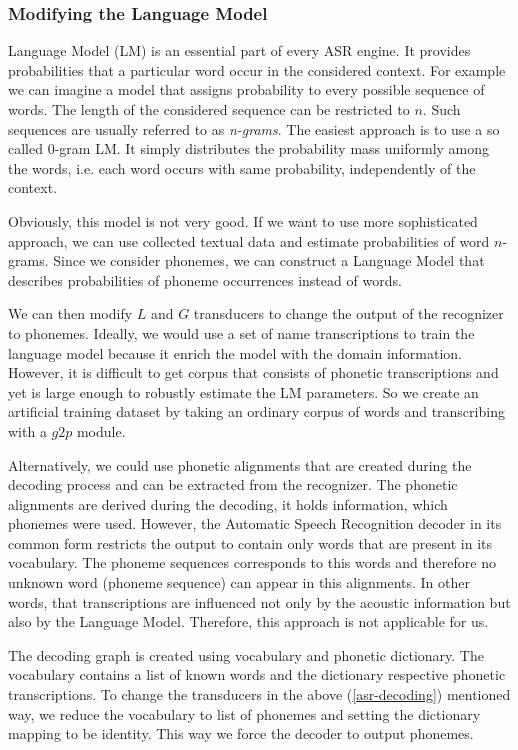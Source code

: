 \subsubsection{Modifying the Language Model}
Language Model (LM) is an essential part of every ASR engine.
It provides probabilities that a particular word occur in the considered context. 
For example we can imagine a model that assigns probability to every possible sequence of words.
The length of the considered sequence can be restricted to $n$.
Such sequences are usually referred to as \textit{n-grams}.
The easiest approach is to use a so called 0-gram LM.
It simply distributes the probability mass uniformly among the words, i.e. each word occurs with same probability, independently of the context.
\par
Obviously, this model is not very good.
If we want to use more sophisticated approach, we can use collected textual data and estimate probabilities of word $n$-grams.
Since we consider phonemes, we can construct a Language Model that describes probabilities of phoneme occurrences instead of words.
\par
We can then modify $L$ and $G$ transducers to change the output of the recognizer to phonemes.
Ideally, we would use a set of name transcriptions to train the language model because it enrich the model with the domain information.
However, it is difficult to get corpus that consists of phonetic transcriptions and yet is large enough to robustly estimate the LM parameters.
So we create an artificial training dataset by taking an ordinary corpus of words and transcribing with a $g2p$ module.
\par
Alternatively, we could use phonetic alignments that are created during the decoding process and can be extracted from the recognizer.
The phonetic alignments are derived during the decoding, it holds information, which phonemes were used.
However, the Automatic Speech Recognition decoder in its common form restricts the output to contain only words that are present in its vocabulary.
The phoneme sequences corresponds to this words and therefore no unknown word (phoneme sequence) can appear in this alignments.
In other words, that transcriptions are influenced not only by the acoustic information but also by the Language Model.
Therefore, this approach is not applicable for us.
\par
The decoding graph is created using vocabulary and phonetic dictionary.
The vocabulary contains a list of known words and the dictionary respective phonetic transcriptions.
To change the transducers in the above (\ref{asr-decoding}) mentioned way, we reduce the vocabulary to list of phonemes and setting the dictionary mapping to be identity.
This way we force the decoder to output phonemes.
